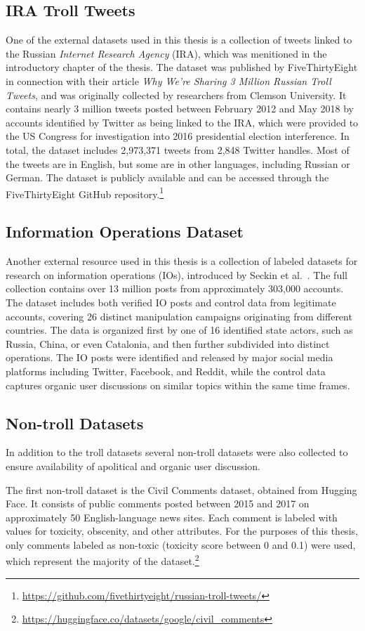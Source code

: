 \documentclass[twoside]{ctuthesis}
\theoremstyle{plain}
\theoremstyle{definition}
\theoremstyle{note}
\begin{document}
\subsection{IRA Troll Tweets}
One of the external datasets used in this thesis is a collection of tweets linked to the Russian \textit{Internet Research Agency} (IRA), which was menitioned in the introductory chapter of the thesis. The dataset was published by FiveThirtyEight in connection with their article \textit{Why We’re Sharing 3 Million Russian Troll Tweets}, and was originally collected by researchers from Clemson University. It contains nearly 3 million tweets posted between February 2012 and May 2018 by accounts identified by Twitter as being linked to the IRA, which were provided to the US Congress for investigation into 2016 presidential election interference. In total, the dataset includes 2,973,371 tweets from 2,848 Twitter handles. Most of the tweets are in English, but some are in other languages, including Russian or German. The dataset is publicly available and can be accessed through the FiveThirtyEight GitHub repository.\footnote{\url{https://github.com/fivethirtyeight/russian-troll-tweets/}}

\subsection{Information Operations Dataset}
Another external resource used in this thesis is a collection of labeled datasets for research on information operations (IOs), introduced by Seckin et al.~\cite{Seckin2024}. The full collection contains over 13 million posts from approximately 303,000 accounts. The dataset includes both verified IO posts and control data from legitimate accounts, covering 26 distinct manipulation campaigns originating from different countries. The data is organized first by one of 16 identified state actors, such as Russia, China, or even Catalonia, and then further subdivided into distinct operations. The IO posts were identified and released by major social media platforms including Twitter, Facebook, and Reddit, while the control data captures organic user discussions on similar topics within the same time frames.

\subsection{Non-troll Datasets}
In addition to the troll datasets several non-troll datasets were also collected to ensure availability of apolitical and organic user discussion.\par
The first non-troll dataset is the Civil Comments dataset, obtained from Hugging Face. It consists of public comments posted between 2015 and 2017 on approximately 50 English-language news sites. Each comment is labeled with values for toxicity, obscenity, and other attributes. For the purposes of this thesis, only comments labeled as non-toxic (toxicity score between 0 and 0.1) were used, which represent the majority of the dataset.\footnote{\url{https://huggingface.co/datasets/google/civil_comments}}\par
\end{document}

